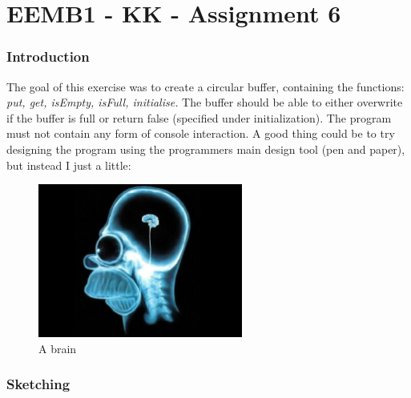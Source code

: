 

\part*{EEMB1 - KK - Assignment 6}
\section{Introduction}
The goal of this exercise was to create a circular buffer, containing the functions: \textit{put, get, isEmpty, isFull, initialise.}
The buffer should be able to either overwrite if the buffer is full or return false (specified under initialization). The program
must not contain any form of console interaction.
A good thing could be to try designing the program using the programmers main design tool (pen and paper), but instead I just a little:
\\ \newline
\begin{figure}[h!]		%
	\begin{centering}
 		\includegraphics[width=0.6\textwidth]{brain.jpg}
		\caption{A brain}
	\end{centering}
\end{figure}

\newpage
\section{Sketching}
